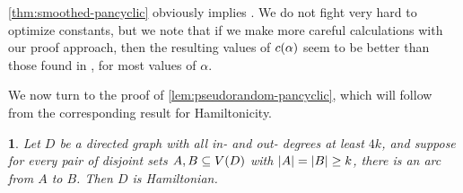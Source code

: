 \documentclass[11pt,english]{article}
\theoremstyle{plain}
\theoremstyle{definition}
\theoremstyle{definition}
\theoremstyle{plain}
\theoremstyle{plain}
\theoremstyle{plain}
\newtheorem{lem}[thm]{\protect\lemmaname}
\theoremstyle{plain}
\theoremstyle{remark}
\theoremstyle{remark}
\let\originalleft\left
\let\originalright\right
\renewcommand{\left}{\mathopen{}\mathclose\bgroup\originalleft}
\renewcommand{\right}{\aftergroup\egroup\originalright}
\providecommand{\lemmaname}{Lemma}
\begin{document}
\ref{thm:smoothed-pancyclic} obviously implies \cite[Theorems~1 and~3]{BFM03}.
We do not fight very hard to optimize constants, but we note that if we make more careful calculations with our proof approach, then the resulting values of $\cdi\left(\alpha\right)$ seem to be better
than those found in \cite{BFM03}, for most values of $\alpha$.

We now turn to the proof of \ref{lem:pseudorandom-pancyclic}, which
will follow from the corresponding result for Hamiltonicity.
\begin{lem}
\label{lem:pseudorandom-hamiltonian}Let $D$ be a directed graph
with all in- and out- degrees at least $4k$, and suppose for every pair of
disjoint sets $A,B\subseteq V\left(D\right)$ with $\left|A\right|=\left|B\right|\ge k$,
there is an arc from $A$ to $B$. Then $D$ is Hamiltonian.\end{lem}
\end{document}
